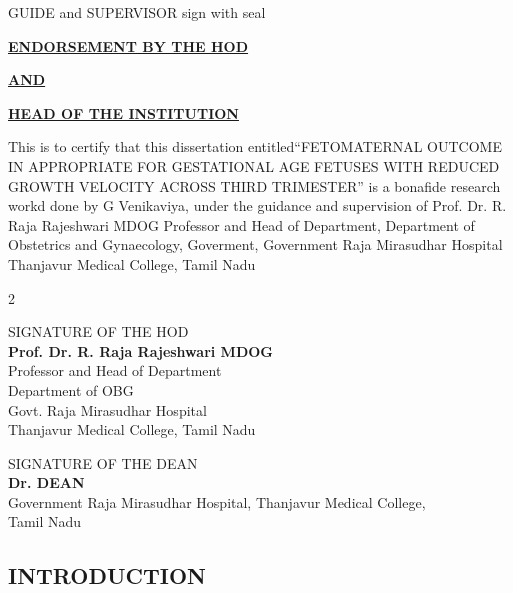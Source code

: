 \documentclass[14pt]{extarticle}
\def\name{G Venikaviya}
\def\study{FETOMATERNAL OUTCOME IN APPROPRIATE FOR GESTATIONAL AGE FETUSES WITH REDUCED GROWTH VELOCITY ACROSS THIRD TRIMESTER}
\def\guide{Prof. Dr. R. Raja Rajeshwari MDOG}
\def\guidedes{Professor and Head of Department}
\begin{document}
\vspace{30mm}
\begin{flushright}
\begin{bfseries}
    GUIDE and SUPERVISOR sign with seal
\end{bfseries}
\end{flushright}

\newpage

\null

\centerline{\underline{{\large\textbf{ENDORSEMENT BY THE HOD }}}}
\vspace{3mm}
\centerline{\underline{{\large\textbf{AND }}}}
\vspace{3mm}
\centerline{\underline{{\large\textbf{HEAD OF THE INSTITUTION}}}}

\vspace{7mm}
This is to certify that this dissertation entitled``\study'' is a
bonafide research workd done by \name, under the guidance and supervision of
\guide{} \guidedes, Department of Obstetrics and Gynaecology, Goverment,
Government Raja Mirasudhar Hospital Thanjavur Medical College, Tamil Nadu

\vspace{30mm}


\begin{multicols}{2}
\begin{flushleft}
    {\small SIGNATURE OF THE HOD\\[5pt]\textbf{\guide} \\[5pt]\guidedes \\ Department of OBG\\Govt. Raja Mirasudhar Hospital\\ Thanjavur Medical College, Tamil Nadu} 
\end{flushleft}

\begin{flushleft}
    {\small SIGNATURE OF THE DEAN\\[5pt]\textbf{Dr. DEAN} \\ Government Raja
    Mirasudhar Hospital, Thanjavur Medical College, \\ Tamil Nadu} 
\end{flushleft}
\end{multicols}


\newpage
\null

\centering\tableofcontents

\newpage
\justifying
{}
\setcounter{page}{1}

\null
\vfill
\begin{flushright}
\raggedleft\section{INTRODUCTION}
\end{flushright}
\hrulefill
\end{document}
